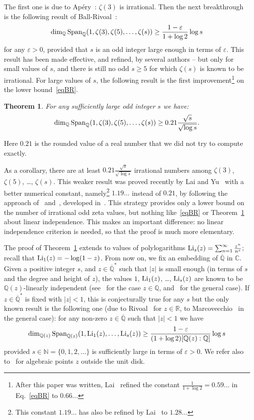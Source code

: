 \documentclass[12pt]{article}
\numberwithin{equation}{section}
\newtheorem{Th}{Theorem}
\newcommand{\N}{\mathbb{N}}
\newcommand{\Q}{\mathbb{Q}}
\newcommand{\Qbar}{\overline{\mathbb{Q}}}
\newcommand{\R}{\mathbb{R}}
\newcommand{\C}{\mathbb{C}}
\newcommand{\etoile}{^\ast}
\newcommand{\Span}{{\rm Span}}
\newcommand{\eps}{\varepsilon}
\newcommand{\Li}{{\rm Li}}
\begin{document}
 The first one is due to Ap\'ery~\cite{Apery}: $\zeta(3)$ is irrational. Then the next breakthrough is the following result of Ball-Rivoal~\cite{BR, RivoalCRAS}:
 \begin{equation} \label{eqBR}
\dim_\Q \Span_\Q (1, \zeta(3), \zeta(5), \ldots, \zeta(s)) \geq \frac{1-\eps }{1+\log 2}\log s 
 \end{equation}
for any $\eps>0$, provided that $s$ is an odd integer large enough in terms of $\eps$. This result has been made effective, and refined, by several authors -- but only for small values of $s$, and there is still no odd $s\geq 5$ for which $\zeta(s)$ is known to be irrational. For large values of $s$, the following result is the first improvement\footnote{After this paper was written, Lai~\cite{Lai2024} refined the constant $\frac{1 }{1+\log 2}=0.59\ldots$ in Eq.~\eqref{eqBR} to $0.66\ldots$} on the lower bound~\eqref{eqBR}.
\begin{Th} \label{thintroun} For any sufficiently large odd integer $s$ we have:
$$\dim_{\Q } \Span_{\Q } (1,\zeta(3),\zeta(5),\ldots,\zeta(s)) \geq 0.21 \frac{\sqrt{s}}{\sqrt{ \log s}} .$$
\end{Th}
Here $0.21$ is the rounded value of a real number that we did not try to compute exactly.


\bigskip

As a corollary, there are at least $ 0.21 \frac{\sqrt{s}}{\sqrt{ \log s}} $ irrational numbers among $\zeta(3)$, $\zeta(5)$, \ldots, $\zeta(s)$. This weaker result was proved recently by Lai and Yu~\cite{LaiYu} with a better numerical constant, namely\footnote{This constant $1.19\ldots$ has also be refined by Lai~\cite{Lai2025} to $1.28\ldots$} $1.19\ldots$ instead of $0.21$, by following the approach of~\cite{Zudilintrick} and~\cite{Sprang}, developed in~\cite{FSZ}. This strategy provides only a lower bound on the number of irrational odd zeta values, but nothing like~\eqref{eqBR} or Theorem~\ref{thintroun} about linear independence. This makes an important difference: no linear independence criterion is needed, so that the proof is much more elementary.


\bigskip

The proof of Theorem~\ref{thintroun} extends to values of polylogarithms $\Li_s(z) = \sum_{n=1}^\infty \frac{z^n}{n^s}$; recall that $\Li_1(z) = -\log(1-z)$. From now on, we fix an embedding of $\Qbar $ in $\C$. 
Given a positive integer $s$, and $z\in\Qbar\etoile$ such that $|z|$ is small enough (in terms of $s$ and the degree and height of $z$), the values $1$, $\Li_1(z)$, \ldots, $\Li_s(z)$ are known to be $\Q(z)$-linearly independent 
(see~\cite{Nikishin, Hatapolylogs} for the case $z\in\Q$, and~\cite{Chudseul, Chuddeux, Andre} for the general case).
If $z\in\Qbar\etoile$ is fixed with $|z|<1$, this is conjecturally true for any $s$ but the only known result is the following one (due to Rivoal~\cite{Rivoalpolylogs} for $z\in\R$, to Marcovecchio~\cite{Marcovecchio} in the general case): for any non-zero $z\in\Qbar$ such that $|z|<1$ we have 
$$\dim_{\Q(z)} \Span_{\Q(z)} (1,\Li_1(z),\ldots,\Li_s(z))\geq \frac{1 -\eps}{(1+\log 2)[\Q(z):\Q]} \log s $$
provided $s\in\N=\{0,1,2,\ldots\}$ is sufficiently large in terms of $\eps>0$. We refer also to~\cite{gfndio2} for algebraic points $z$ outside the unit disk.
\end{document}
